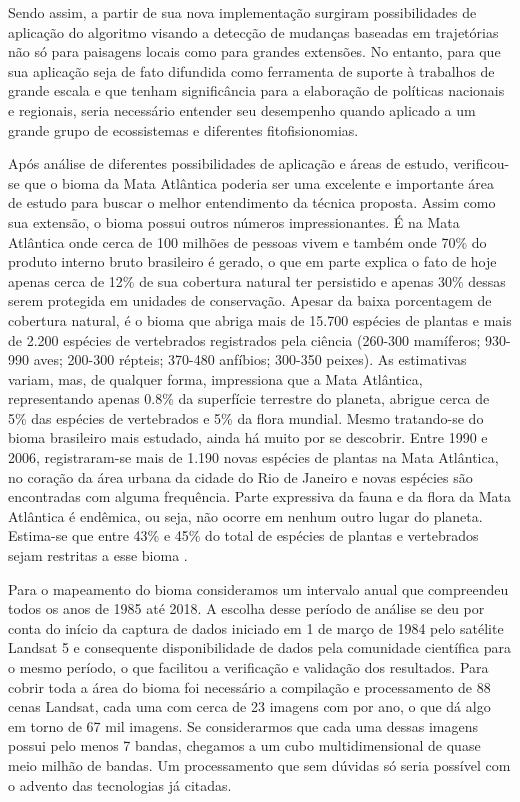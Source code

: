 \documentclass[12pt,a4paper]{article}
\begin{document}
Sendo assim, a partir de sua nova implementação surgiram possibilidades de aplicação do algoritmo visando a detecção de mudanças baseadas em trajetórias não só para paisagens locais como para grandes extensões. No entanto, para que sua aplicação seja de fato difundida como ferramenta de suporte à trabalhos de grande escala e que tenham significância para a elaboração de políticas nacionais e regionais, seria necessário entender seu desempenho quando aplicado a um grande grupo de ecossistemas e diferentes fitofisionomias.

Após análise de diferentes possibilidades de aplicação e áreas de estudo, verificou-se que o bioma da Mata Atlântica poderia ser uma excelente e importante área de estudo para buscar o melhor entendimento da técnica proposta. Assim como sua extensão, o bioma possui outros números impressionantes. É na Mata Atlântica onde cerca de 100 milhões de pessoas vivem e também onde 70\% do produto interno bruto brasileiro é gerado, o que em parte explica o fato de hoje apenas cerca de 12\% de sua cobertura natural ter persistido e apenas 30\% dessas serem protegida em unidades de conservação. Apesar da baixa porcentagem de cobertura natural, é o bioma que abriga mais de 15.700 espécies de plantas e mais de 2.200 espécies de vertebrados registrados pela ciência (260-300 mamíferos; 930-990 aves; 200-300 répteis; 370-480 anfíbios; 300-350 peixes). As estimativas variam, mas, de qualquer forma, impressiona que a Mata Atlântica, representando apenas 0.8\% da superfície terrestre do planeta, abrigue cerca de 5\% das espécies de vertebrados e 5\% da flora mundial. Mesmo tratando-se do bioma brasileiro mais estudado, ainda há muito por se descobrir. Entre 1990 e 2006, registraram-se mais de 1.190 novas espécies de plantas na Mata Atlântica, no coração da área urbana da cidade do Rio de Janeiro e novas espécies são encontradas com alguma frequência. Parte expressiva da fauna e da flora da Mata Atlântica é endêmica, ou seja, não ocorre em nenhum outro lugar do planeta. Estima-se que entre 43\% e 45\% do total de espécies de plantas e vertebrados sejam restritas a esse bioma \citep{scarano2014}.

Para o mapeamento do bioma consideramos um intervalo anual que compreendeu todos os anos de 1985 até 2018. A escolha desse período de análise se deu por conta do início da captura de dados iniciado em 1 de março de 1984 pelo satélite Landsat 5 e consequente disponibilidade de dados pela comunidade científica para o mesmo período, o que facilitou a verificação e validação dos resultados. Para cobrir toda a área do bioma foi necessário a compilação e processamento de 88 cenas Landsat, cada uma com cerca de 23 imagens com por ano, o que dá algo em torno de 67 mil imagens. Se considerarmos que cada uma dessas imagens possui pelo menos 7 bandas, chegamos a um cubo multidimensional de quase meio milhão de bandas. Um processamento que sem dúvidas só seria possível com o advento das tecnologias já citadas.
\end{document}
